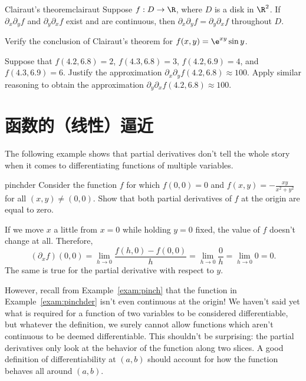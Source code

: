 \documentclass[indent]{watsonbook}
\begin{document}
{\begin{theo}{Clairaut's theorem}{clairaut}
  Suppose $f:D \to \R$, where $D$ is a disk in $\R^2$. If
  $\partial_x \partial_y f$ and $\partial_y \partial_x f$ exist and
  are continuous, then $\partial_x \partial_y f = \partial_y
  \partial_x f$ throughout $D$.
\end{theo}

\begin{exercise}{}{}
  Verify the conclusion of Clairaut's theorem for $f(x,y) = \e^{xy}
  \sin y$.
\end{exercise}

\begin{exercise}{}{}
  Suppose that $f(4.2,6.8) = 2$, $f(4.3,6.8) = 3$, $f(4.2,6.9) = 4$, and $f(4.3,6.9) = 6$. Justify the approximation $\partial_x \partial_y f(4.2,6.8) \approx 100$. Apply similar reasoning to obtain the approximation $\partial_y \partial_x f(4.2,6.8) \approx 100$.
\end{exercise}

\section{函数的（线性）逼近} \label{sec:linapprox}


The following example shows that partial derivatives don't tell the
whole story when it comes to differentiating functions of multiple
variables.

\begin{example}{}{pinchder}
  Consider the function $f$ for which $f(0,0)=0$ and $f(x,y) =
  -\frac{xy}{x^2 + y^2}$ for all $(x,y) \neq (0,0)$. Show that both
  partial derivatives of $f$ at the origin are equal to zero.
\end{example}

\begin{solution}
  If we move $x$ a little from $x=0$ while holding $y=0$ fixed, the
  value of $f$ doesn't change at all. Therefore,
  \[
    (\partial_x f)(0,0) = \lim_{h \to 0} \frac{f(h,0) - f(0,0)}{h} =
    \lim_{h \to 0} \frac{0}{h} =  \lim_{h \to 0} 0 = 0.
  \]
  The same is true for the partial derivative with respect to $y$.
\end{solution}

However, recall from Example~\ref{exam:pinch} that the function in
Example~\ref{exam:pinchder} isn't even continuous at the origin! We
haven't said yet what is required for a function of two variables to
be considered differentiable, but whatever the definition, we surely
cannot allow functions which aren't continuous to be deemed
differentiable. This shouldn't be surprising: the partial derivatives
only look at the behavior of the function along two slices. A good
definition of differentiability at $(a,b)$ should account for how the
function behaves all around $(a,b)$.

}
\end{document}
